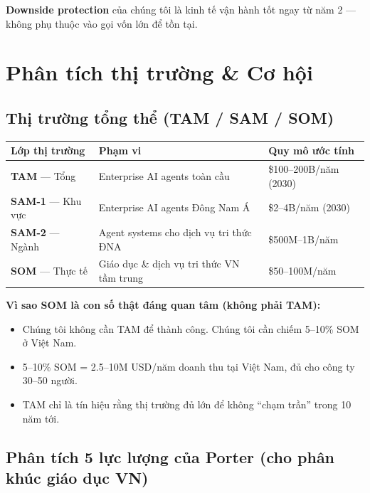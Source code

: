 \documentclass[11pt,a4paper]{article}
\begin{document}
\textbf{Downside protection} của chúng tôi là kinh tế vận hành tốt ngay từ năm 2
--- không phụ thuộc vào gọi vốn lớn để tồn tại.

\clearpage

\section{Phân tích thị trường \& Cơ hội}

\subsection{Thị trường tổng thể (TAM / SAM / SOM)}

\begin{tabularx}{\linewidth}{@{}p{2.8cm} X p{3cm}@{}}
\toprule
\textbf{Lớp thị trường} & \textbf{Phạm vi} & \textbf{Quy mô ước tính} \\
\midrule
\textbf{TAM} --- Tổng & Enterprise AI agents toàn cầu & \$100--200B/năm (2030) \\
\textbf{SAM-1} --- Khu vực & Enterprise AI agents Đông Nam Á & \$2--4B/năm (2030) \\
\textbf{SAM-2} --- Ngành & Agent systems cho dịch vụ tri thức ĐNA & \$500M--1B/năm \\
\textbf{SOM} --- Thực tế & Giáo dục \& dịch vụ tri thức VN tầm trung & \$50--100M/năm \\
\bottomrule
\end{tabularx}

\textbf{Vì sao SOM là con số thật đáng quan tâm (không phải TAM):}
\begin{itemize}
\item Chúng tôi không cần TAM để thành công. Chúng tôi cần chiếm 5--10\% SOM ở Việt Nam.
\item 5--10\% SOM = 2.5--10M USD/năm doanh thu tại Việt Nam, đủ cho công ty 30--50 người.
\item TAM chỉ là tín hiệu rằng thị trường đủ lớn để không ``chạm trần'' trong 10 năm tới.
\end{itemize}

\subsection{Phân tích 5 lực lượng của Porter (cho phân khúc giáo dục VN)}
\end{document}
